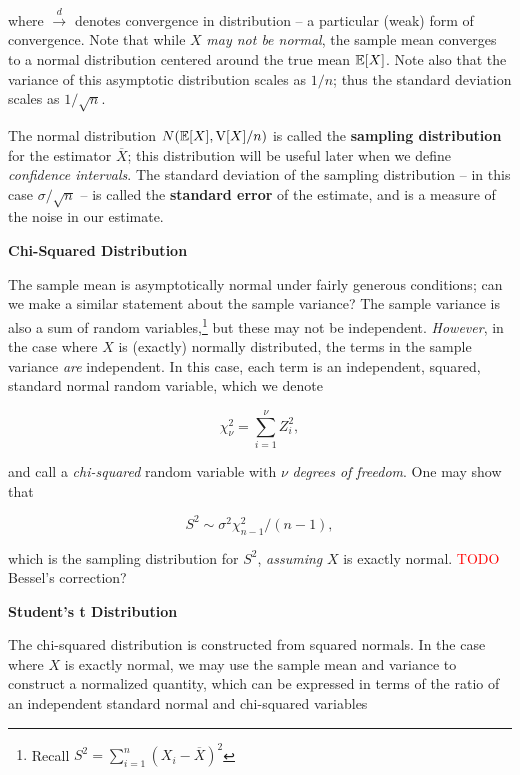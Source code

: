 \documentclass[../primer.tex]{subfiles}
\begin{document}
\noindent where $\stackrel{d}{\to}$ denotes convergence in distribution -- a
particular (weak) form of convergence. Note that while $X$ \emph{may not be
  normal}, the sample mean converges to a normal distribution centered around
the true mean $\mathbb{E}[X]$. Note also that the variance of this asymptotic
distribution scales as $1/n$; thus the standard deviation scales as
$1/\sqrt{n}$.

The normal distribution $N(\mathbb{E}[X], \mathrm{V}[X]/n)$ is called the \textbf{sampling
  distribution} for the estimator $\overline{X}$; this distribution will be
useful later when we define \emph{confidence intervals}. The standard deviation
of the sampling distribution -- in this case $\sigma/\sqrt{n}$ -- is called the
\textbf{standard error} of the estimate, and is a measure of the noise in our
estimate.

\noindent\textbf{Chi-Squared Distribution}

The sample mean is asymptotically normal under fairly generous conditions; can
we make a similar statement about the sample variance? The sample variance is
also a sum of random variables,\footnote{Recall $S^2 = \sum_{i=1}^n (X_i -
  \overline{X})^2$} but these may not be independent. \emph{However}, in the
case where $X$ is (exactly) normally distributed, the terms in the sample
variance \emph{are} independent. In this case, each term is an independent,
squared, standard normal random variable, which we denote

\begin{equation} \label{eq:chi-squared}
  \chi^2_{\nu} = \sum_{i=1}^{\nu} Z_i^2,
\end{equation}

\noindent and call a \emph{chi-squared} random variable with $\nu$ \emph{degrees
  of freedom}. One may show that

\begin{equation} \label{eq:sample-dist-var}
  S^2 \sim \sigma^2 \chi^2_{n-1} / (n-1),
\end{equation}

\noindent which is the sampling distribution for $S^2$, \emph{assuming} $X$ is
exactly normal. \textcolor{red}{TODO} Bessel's correction?

\noindent\textbf{Student's t Distribution}

The chi-squared distribution is constructed from squared normals. In the case
where $X$ is exactly normal, we may use the sample mean and variance to
construct a normalized quantity, which can be expressed in terms of the ratio of
an independent standard normal and chi-squared variables
\end{document}
